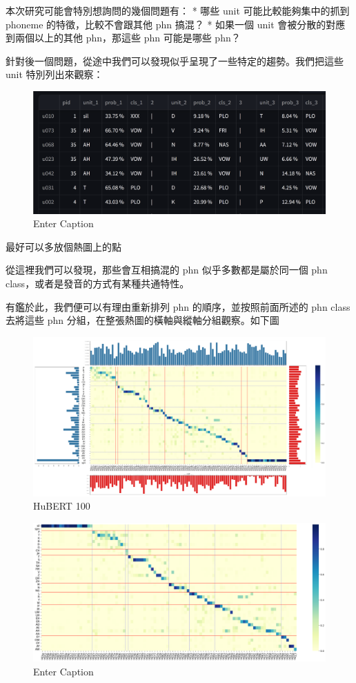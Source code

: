         本次研究可能會特別想詢問的幾個問題有：
        * 哪些 unit 可能比較能夠集中的抓到 phoneme 的特徵，比較不會跟其他 phn 搞混？
        * 如果一個 unit 會被分散的對應到兩個以上的其他 phn，那這些 phn 可能是哪些 phn？

        針對後一個問題，從途中我們可以發現似乎呈現了一些特定的趨勢。我們把這些 unit 特別列出來觀察：

{

\begin{figure}
    \centering
    \includegraphics[width=0.5\linewidth]{figures/confuseunit.png}
    \caption{Enter Caption}
    \label{fig:enter-label}
\end{figure}


最好可以多放個熱圖上的點
}

從這裡我們可以發現，那些會互相搞混的 phn 似乎多數都是屬於同一個 phn class，或者是發音的方式有某種共通特性。

有鑑於此，我們便可以有理由重新排列 phn 的順序，並按照前面所述的 phn class 去將這些 phn 分組，在整張熱圖的橫軸與縱軸分組觀察。如下圖 


{



\begin{figure}\centering
    \includegraphics[width=1\linewidth]{figures/better__p_ph_given_un.png}\caption{HuBERT 100}\label{p_p_given_u-hub-100}
\end{figure}
\begin{figure}
    \centering
    \includegraphics[width=0.5\linewidth]{figures/newhub.png}
    \caption{Enter Caption}
    \label{fig:enter-label}
\end{figure}

}

